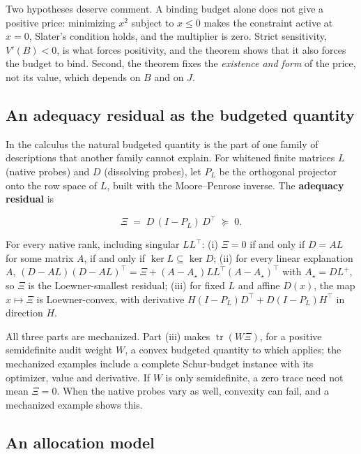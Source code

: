 Two hypotheses deserve comment. A binding budget alone does not give a
positive price: minimizing \(x^2\) subject to \(x\le 0\) makes the
constraint active at \(x=0\), Slater's condition holds, and the
multiplier is zero. Strict sensitivity, \(V'(B)<0\), is what forces
positivity, and the theorem shows that it also forces the budget to
bind. Second, the theorem fixes the \emph{existence and form} of the
price, not its value, which depends on \(B\) and on \(J\).

\hypertarget{an-adequacy-residual-as-the-budgeted-quantity}{%
\subsection{An adequacy residual as the budgeted
quantity}\label{an-adequacy-residual-as-the-budgeted-quantity}}

In the calculus the natural budgeted quantity is the part of one family
of descriptions that another family cannot explain. For whitened finite
matrices \(L\) (native probes) and \(D\) (dissolving probes), let
\(P_L\) be the orthogonal projector onto the row space of \(L\), built
with the Moore--Penrose inverse. The \textbf{adequacy residual} is

\[\Xi \;=\; D\,(I-P_L)\,D^{\top}\;\succeq\;0 .\]

\begin{proposition}\label{prop:schur}
For every native rank, including singular $LL^{\top}$:
(i) $\Xi=0$ if and only if $D=AL$ for some matrix $A$, if and only if $\ker L\subseteq\ker D$;
(ii) for every linear explanation $A$,
$(D-AL)(D-AL)^{\top}=\Xi+(A-A_\star)LL^{\top}(A-A_\star)^{\top}$ with $A_\star=DL^{+}$, so $\Xi$ is the
Loewner-smallest residual;
(iii) for fixed $L$ and affine $D(x)$, the map $x\mapsto\Xi$ is Loewner-convex, with derivative
$H(I-P_L)D^{\top}+D(I-P_L)H^{\top}$ in direction $H$.
\end{proposition}

All three parts are mechanized. Part (iii) makes
\(\operatorname{tr}(W\Xi)\), for a positive semidefinite audit weight
\(W\), a convex budgeted quantity to which  applies; the
mechanized examples include a complete Schur-budget instance with its
optimizer, value and derivative. If \(W\) is only semidefinite, a zero
trace need not mean \(\Xi=0\). When the native probes vary as well,
convexity can fail, and a mechanized example shows this.

\hypertarget{an-allocation-model}{%
\subsection{An allocation model}\label{an-allocation-model}}

